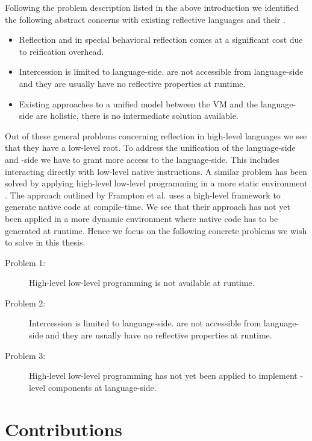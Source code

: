 Following the problem description listed in the above introduction we identified the following abstract concerns with existing reflective languages and their \VMs.
%
\begin{itemize}
	\item Reflection and in special behavioral reflection comes at a significant cost due to reification overhead.
		
	\item Intercession is limited to language-side.
	\VMs are not accessible from language-side and they are usually have no reflective properties at runtime. 
	
	\item Existing approaches to a unified model between the VM and the language-side are holistic, there is no intermediate solution available.
\end{itemize}

\noindent Out of these general problems concerning reflection in high-level languages we see that they have a low-level root.
To address the unification of the language-side and \VM-side we have to grant more access to the language-side.
This includes interacting directly with low-level native instructions.
A similar problem has been solved by applying high-level low-level programming in a more static environment \cite{Fram09a}.
The approach outlined by Frampton et al. uses a high-level framework to generate native code at compile-time.
We see that their approach has not yet been applied in a more dynamic environment where native code has to be generated at runtime.
Hence we focus on the following concrete problems we wish to solve in this thesis.

\begin{description}
	\item[Problem 1:] High-level low-level programming is not available at runtime.
	
	\item[Problem 2:] Intercession is limited to language-side.
	\VMs are not accessible from language-side and they are usually have no reflective properties at runtime.
	
	\item[Problem 3:] High-level low-level programming has not yet been applied to implement \VM-level components at language-side.
\end{description}


\section{Contributions}

